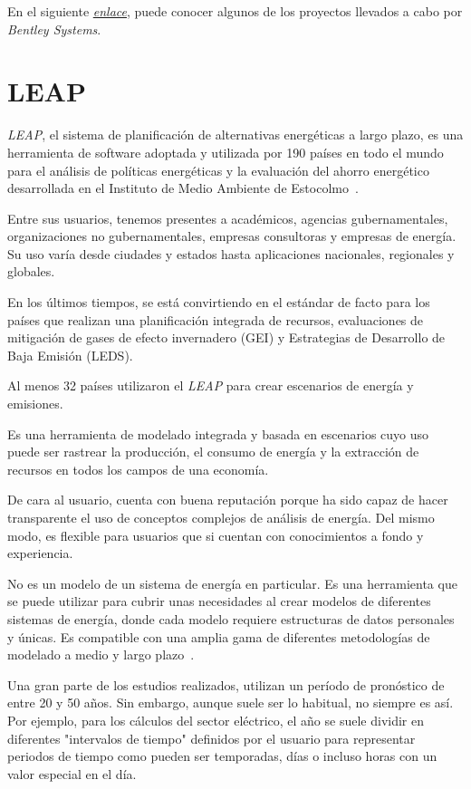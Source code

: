En el siguiente \href{https://www.bentley.com/es/project-profiles}{\textit{enlace}}, puede conocer algunos de los proyectos llevados a cabo por \textit{Bentley Systems}.

\section{LEAP}

\textit{LEAP}, el sistema de planificación de alternativas energéticas a largo plazo, es una herramienta de software adoptada y utilizada por 190 países en todo el mundo para el análisis de políticas energéticas y la evaluación del ahorro energético desarrollada en el Instituto de Medio Ambiente de Estocolmo~\cite{web:LEAP}.

Entre sus usuarios, tenemos presentes a académicos, agencias gubernamentales, organizaciones no gubernamentales, empresas consultoras y empresas de energía. Su uso varía desde ciudades y estados hasta aplicaciones nacionales, regionales y globales.

En los últimos tiempos, se está convirtiendo en el estándar de facto para los países que realizan una planificación integrada de recursos, evaluaciones de mitigación de gases de efecto invernadero (GEI) y Estrategias de Desarrollo de Baja Emisión (LEDS).

Al menos 32 países utilizaron el \textit{LEAP} para crear escenarios de energía y emisiones.

Es una herramienta de modelado integrada y basada en escenarios cuyo uso puede ser rastrear la producción, el consumo de energía y la extracción de recursos en todos los campos de una economía. 

De cara al usuario, cuenta con buena reputación porque ha sido capaz de hacer transparente el uso de conceptos complejos de análisis de energía. Del mismo modo, es flexible para usuarios que si cuentan con conocimientos a fondo y experiencia.

No es un modelo de un sistema de energía en particular. Es una herramienta que se puede utilizar para cubrir unas necesidades al crear modelos de diferentes sistemas de energía, donde cada modelo requiere estructuras de datos personales y únicas. Es compatible con una amplia gama de diferentes metodologías de modelado a medio y largo plazo~\cite{web:LEAP}.

Una gran parte de los estudios realizados, utilizan un período de pronóstico de entre 20 y 50 años. Sin embargo, aunque suele ser lo habitual, no siempre es así. Por ejemplo, para los cálculos del sector eléctrico, el año se suele dividir en diferentes "intervalos de tiempo" definidos por el usuario para representar periodos de tiempo como pueden ser temporadas, días o incluso horas con un valor especial en el día.

